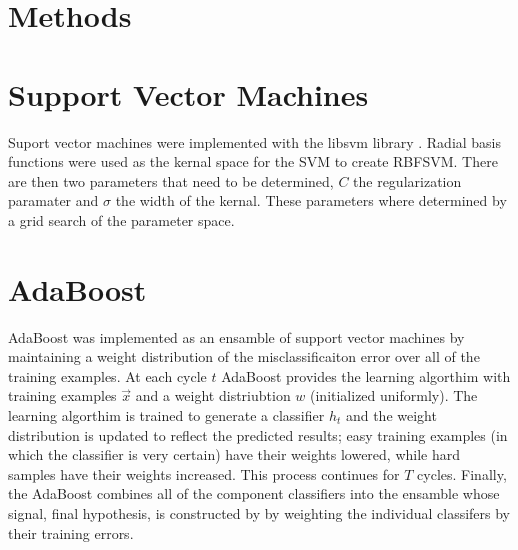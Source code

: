 \section{Methods}
\label{sec:Methods}

\section{Support Vector Machines}

Suport vector machines were implemented with the libsvm library \cite{li_adaboost_2008}.
Radial basis functions were used as the kernal space for the SVM to create RBFSVM.
There are then two parameters that need to be determined, $C$ the regularization paramater and $\sigma$ the width of the kernal.
These parameters where determined by a grid search of the parameter space.

\section{AdaBoost}

AdaBoost was implemented as an ensamble of support vector machines by maintaining a weight distribution of the misclassificaiton error over all of the training examples.
At each cycle $t$ AdaBoost provides the learning algorthim with training examples $\vec{x}$ and a weight distriubtion $w$ (initialized uniformly).
The learning algorthim is trained to generate a classifier $h_t$ and the weight distribution is updated to reflect the predicted results; easy training examples (in which the classifier is very certain) have their weights lowered, while hard samples have their weights increased.
This process continues for $T$ cycles.
Finally, the AdaBoost combines all of the component classifiers into the ensamble whose signal, final hypothesis, is constructed by by weighting the individual classifers by their training errors.

